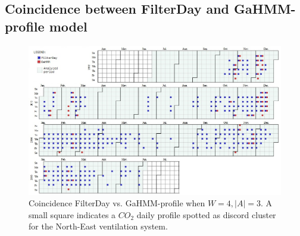 \pagebreak

\begin{landscape}
\leavevmode
\newline

\subsection{Coincidence between FilterDay and GaHMM-profile model}
\label{viz:FilterDay_GaHMM}
\begin{figure}[h!]
  \vspace{0.5em} %
  \includegraphics[scale=0.7]{Figures/GaHMMvsSAX_w4a3.jpg}
  \caption{Coincidence FilterDay vs. GaHMM-profile when $W=4, |A|=3$. A small square indicates a $CO_2$ daily profile spotted as discord cluster for the North-East ventilation system.}
  \label{fig:FilterDay_GaHMM_calendar1}
\end{figure}
\end{landscape}
\restoregeometry
    


